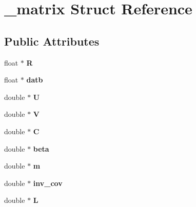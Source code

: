 \hypertarget{struct__matrix}{\section{\-\_\-matrix \-Struct \-Reference}
\label{struct__matrix}
}
\subsection*{\-Public \-Attributes}
\begin{DoxyCompactItemize}
\item 
\hypertarget{struct__matrix_a2b59b0a9ed66accc2be792dbdd3d3b0a}{float $\ast$ {\bfseries \-R}}\label{struct__matrix_a2b59b0a9ed66accc2be792dbdd3d3b0a}

\item 
\hypertarget{struct__matrix_ae7e16a4ca4d0b3c264a878f83c17ace3}{float $\ast$ {\bfseries datb}}\label{struct__matrix_ae7e16a4ca4d0b3c264a878f83c17ace3}

\item 
\hypertarget{struct__matrix_a8fd449d2239389c518e722f15495af87}{double $\ast$ {\bfseries \-U}}\label{struct__matrix_a8fd449d2239389c518e722f15495af87}

\item 
\hypertarget{struct__matrix_a35c8f9b0cb9118a7c1a2cce43979d157}{double $\ast$ {\bfseries \-V}}\label{struct__matrix_a35c8f9b0cb9118a7c1a2cce43979d157}

\item 
\hypertarget{struct__matrix_a5733fed8251aeee007328d72bd0a6994}{double $\ast$ {\bfseries \-C}}\label{struct__matrix_a5733fed8251aeee007328d72bd0a6994}

\item 
\hypertarget{struct__matrix_ade44439d2f8c40fa6694c1fcfa5e3829}{double $\ast$ {\bfseries beta}}\label{struct__matrix_ade44439d2f8c40fa6694c1fcfa5e3829}

\item 
\hypertarget{struct__matrix_ae8bdc33446ee62fd3bf119c48cb5174f}{double $\ast$ {\bfseries m}}\label{struct__matrix_ae8bdc33446ee62fd3bf119c48cb5174f}

\item 
\hypertarget{struct__matrix_afbe2e5a6bf53ced48f0aff8b319de182}{double $\ast$ {\bfseries inv\-\_\-cov}}\label{struct__matrix_afbe2e5a6bf53ced48f0aff8b319de182}

\item 
\hypertarget{struct__matrix_a654665f7dd574dfb355ff1d02d33b5e9}{double $\ast$ {\bfseries \-L}}\label{struct__matrix_a654665f7dd574dfb355ff1d02d33b5e9}


\end{DoxyCompactItemize}
